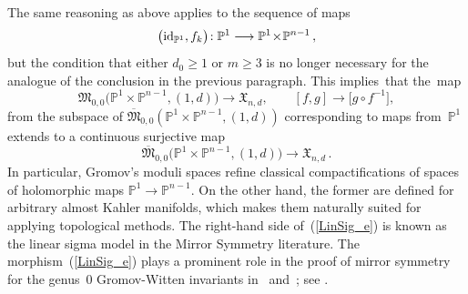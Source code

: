 \documentclass[11pt]{article}
\numberwithin{equation}{section}
\theoremstyle{definition}
\def\BE#1{\begin{equation}\label{#1}}
\def\EE{\end{equation}}
\def\eref#1{(\ref{#1})}
\def\ov#1{\overline{#1}}
\def\lra{\longrightarrow}
\def\fM{\mathfrak M}
\def\P{\mathbb{P}}
\def\fX{\mathfrak X}
\def\id{\textnormal{id}}
\begin{document}
\noindent
The same reasoning as above applies to the sequence of maps 
$$\big(\id_{\P^1},f_k\big)\!:\P^1\lra\P^1\!\times\!\P^{n-1}\,,$$
but the condition that either $d_0\!\ge\!1$ or $m\!\ge\!3$ is no longer
necessary for the analogue of the conclusion in the previous paragraph.
This implies~that the~map
$$\fM_{0,0}\big(\P^1\!\times\!\P^{n-1},(1,d)\big)\lra\fX_{n,d},
\qquad [f,g]\lra\big[g\!\circ\!f^{-1}\big],$$
from the subspace of $\ov\fM_{0,0}(\P^1\!\times\!\P^{n-1},(1,d))$ corresponding
to maps from~$\P^1$ extends to a continuous surjective map
\BE{LinSig_e}\ov\fM_{0,0}\big(\P^1\!\times\!\P^{n-1},(1,d)\big)\lra \fX_{n,d}\,.\EE
In particular, Gromov's moduli spaces refine classical compactifications 
of spaces of holomorphic maps $\P^1\!\lra\!\P^{n-1}$.
On the other hand, the former are defined for arbitrary almost Kahler manifolds,
which makes them naturally suited for applying topological methods.
The right-hand side of~\eref{LinSig_e} is known as the \textsf{linear sigma model}
in the Mirror Symmetry literature.
The morphism~\eref{LinSig_e} plays a prominent role in the proof of 
mirror symmetry for the genus~0 Gromov-Witten invariants in~\cite{Gi} and~\cite{LLY};
see \cite[Section~30.2]{MirSym}.
\end{document}
